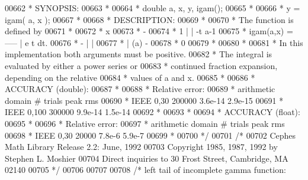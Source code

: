 \begin{DoxyCode}
00662 \textcolor{comment}{     * SYNOPSIS:}
00663 \textcolor{comment}{     *}
00664 \textcolor{comment}{     * double a, x, y, igam();}
00665 \textcolor{comment}{     *}
00666 \textcolor{comment}{     * y = igam( a, x );}
00667 \textcolor{comment}{     *}
00668 \textcolor{comment}{     * DESCRIPTION:}
00669 \textcolor{comment}{     *}
00670 \textcolor{comment}{     * The function is defined by}
00671 \textcolor{comment}{     *}
00672 \textcolor{comment}{     *                           x}
00673 \textcolor{comment}{     *                            -}
00674 \textcolor{comment}{     *                   1       | |  -t  a-1}
00675 \textcolor{comment}{     *  igam(a,x)  =   -----     |   e   t   dt.}
00676 \textcolor{comment}{     *                  -      | |}
00677 \textcolor{comment}{     *                 | (a)    -}
00678 \textcolor{comment}{     *                           0}
00679 \textcolor{comment}{     *}
00680 \textcolor{comment}{     *}
00681 \textcolor{comment}{     * In this implementation both arguments must be positive.}
00682 \textcolor{comment}{     * The integral is evaluated by either a power series or}
00683 \textcolor{comment}{     * continued fraction expansion, depending on the relative}
00684 \textcolor{comment}{     * values of a and x.}
00685 \textcolor{comment}{     *}
00686 \textcolor{comment}{     * ACCURACY (double):}
00687 \textcolor{comment}{     *}
00688 \textcolor{comment}{     *                      Relative error:}
00689 \textcolor{comment}{     * arithmetic   domain     # trials      peak         rms}
00690 \textcolor{comment}{     *    IEEE      0,30       200000       3.6e-14     2.9e-15}
00691 \textcolor{comment}{     *    IEEE      0,100      300000       9.9e-14     1.5e-14}
00692 \textcolor{comment}{     *}
00693 \textcolor{comment}{     *}
00694 \textcolor{comment}{     * ACCURACY (float):}
00695 \textcolor{comment}{     *}
00696 \textcolor{comment}{     *                      Relative error:}
00697 \textcolor{comment}{     * arithmetic   domain     # trials      peak         rms}
00698 \textcolor{comment}{     *    IEEE      0,30        20000       7.8e-6      5.9e-7}
00699 \textcolor{comment}{     *}
00700 \textcolor{comment}{     */}
00701     \textcolor{comment}{/*}
00702 \textcolor{comment}{      Cephes Math Library Release 2.2: June, 1992}
00703 \textcolor{comment}{      Copyright 1985, 1987, 1992 by Stephen L. Moshier}
00704 \textcolor{comment}{      Direct inquiries to 30 Frost Street, Cambridge, MA 02140}
00705 \textcolor{comment}{    */}
00706 
00707 
00708     \textcolor{comment}{/* left tail of incomplete gamma function:}

\end{DoxyCode}
